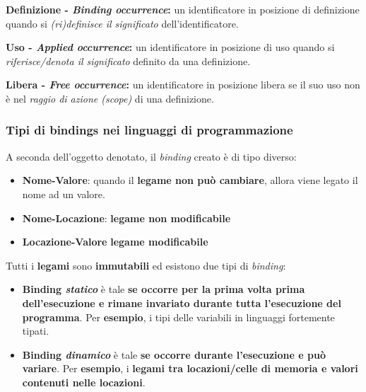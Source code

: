 \documentclass[a4paper]{article}
\begin{document}
	\noindent
	\begin{boxdef}
		\textcolor{Red3}{\textbf{Definizione - \emph{Binding occurrence}:}} un identificatore in posizione di definizione quando si \emph{(ri)definisce il significato} dell'identificatore.
	\end{boxdef}\:\newline

	\noindent
	\begin{boxdef}
		\textcolor{Red3}{\textbf{Uso - \emph{Applied occurrence}:}} un identificatore in posizione di uso quando si \emph{riferisce/denota il significato} definito da una definizione.
	\end{boxdef}\:\newline
	
	\noindent
	\begin{boxdef}
		\textcolor{Red3}{\textbf{Libera - \emph{Free occurrence}:}} un identificatore in posizione libera se il suo uso non è nel \emph{raggio di azione (scope)} di una definizione.
	\end{boxdef}\newpage
	
	
	\subsubsection{Tipi di bindings nei linguaggi di programmazione}
	
	A seconda dell'oggetto denotato, il \emph{binding} creato è di tipo diverso:
	\begin{itemize}
		\item \textbf{Nome-Valore}: quando il \textbf{legame non può cambiare}, allora viene legato il nome ad un valore.
		
		\item \textbf{Nome-Locazione}: \textbf{legame non modificabile}
		
		\item \textbf{Locazione-Valore} \textbf{legame modificabile}
	\end{itemize}
	Tutti i \textbf{legami} sono \textbf{immutabili} ed esistono due tipi di \emph{binding}:
	\begin{itemize}
		\item \textbf{Binding \emph{statico}} è tale \textbf{se occorre per la prima volta prima dell'esecuzione e rimane invariato durante tutta l'esecuzione del programma}.\newline
		Per \textcolor{Green4}{\textbf{esempio}}, i tipi delle variabili in linguaggi fortemente tipati.
		
		\item \textbf{Binding \emph{dinamico}} è tale \textbf{se occorre durante l'esecuzione e può variare}.\newline
		Per \textcolor{Green4}{\textbf{esempio}}, i \textbf{legami tra locazioni/celle di memoria e valori contenuti nelle locazioni}.
	\end{itemize}\newpage
	
\end{document}
